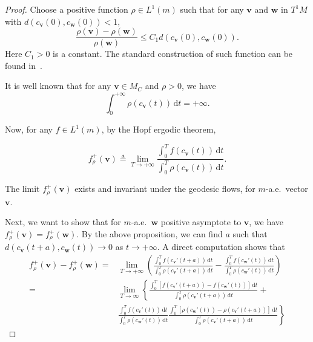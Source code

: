 \documentclass[reqno,11pt]{article}
\theoremstyle{definition}
\theoremstyle{remark}
\numberwithin{equation}{section}
\begin{document}
\begin{proof}
   Choose a positive function $\rho\in L^1(m)$ such that for any $\bm{v}$ and $\bm{w}$ in $T^1 M$ with $d(c_{\bm{v}}(0),c_{\bm{w}}(0))<1$, 
   \begin{displaymath}
       \frac{\rho(\bm{v})-\rho(\bm{w})}{\rho(\bm{w})}\leq C_1 d(c_{\bm{v}}(0),c_{\bm{w}}(0)).
   \end{displaymath}
   Here $C_1>0$ is a constant. The standard construction of such function can be found in~\cite{Ni}.

It is well known that for any $\bm{v}\in M_C$ and $\rho>0$, we have 
\begin{displaymath}
    \int_0^{+\infty}\rho(c_{\bm{v}}(t))\,\mathrm{d}t=+\infty.
\end{displaymath}

Now, for any $f\in L^1(m)$, by the Hopf ergodic theorem,

\begin{displaymath}
f_{\rho}^{+}(\bm{v})\triangleq \lim_{T\to +\infty} \frac{\int_0^T f(c_{\bm{v}}(t))\,\mathrm{d}t}{\int_0^T \rho(c_{\bm{v}}(t))\,\mathrm{d}t}.
\end{displaymath}

The limit $f_{\rho}^{+}(\bm{v})$ exists and invariant under the geodesic flows, for $m$-a.e.\ vector $\bm{v}$.

Next, we want to show that for $m$-a.e.\ $\bm{w}$ positive asymptote to $\bm{v}$, we have $f_{\rho}^{+}(\bm{v})=f_{\rho}^{+}(\bm{w})$. By the above proposition, we can find $a$ such that $d(c_{\bm{v}}(t+a),c_{\bm{w}}(t))\to 0$ as $t\to +\infty$. A direct computation shows that
\begin{displaymath}
\begin{aligned}
   f_{\rho}^{+}(\bm{v})-f_{\rho}^{+}(\bm{w})
   =&\lim_{T\to +\infty}\left(\frac{\int_0^T f(c_{\bm{v}}'(t+a))\,\mathrm{d}t}{\int_0^T \rho(c_{\bm{v}}'(t+a))\,\mathrm{d}t}-\frac{\int_0^T f(c_{\bm{w}}'(t))\,\mathrm{d}t}{\int_0^T \rho(c_{\bm{w}}'(t))\,\mathrm{d}t}\right)\\
   =&\lim_{T\to\infty}\left\{\frac{\int_0^T[f(c_{\bm{v}}'(t+a))-f(c_{\bm{w}}'(t))]\,\mathrm{d}t}{\int_0^T \rho(c_{\bm{v}}'(t+a))\,\mathrm{d}t}+\right.\\
    &\left. \frac{\int_0^T f(c_{\bm{v}}'(t))\,\mathrm{d}t}{\int_0^T \rho(c_{\bm{w}}'(t))\,\mathrm{d}t}\frac{\int_0^T[\rho(c_{\bm{w}}'(t))-\rho(c_{\bm{v}}'(t+a))]\,\mathrm{d}t}{\int_0^T \rho(c_{\bm{v}}'(t+a))\,\mathrm{d}t}\right\}
\end{aligned}        
\end{displaymath}


\end{proof}
\end{document}
